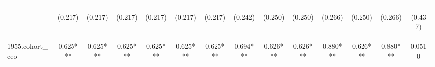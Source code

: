 \begin{center}
\begin{tabular}{lccccccccccccc}
\vspace{4pt} & \begin{footnotesize}(0.217)\end{footnotesize} & \begin{footnotesize}(0.217)\end{footnotesize} & \begin{footnotesize}(0.217)\end{footnotesize} & \begin{footnotesize}(0.217)\end{footnotesize} & \begin{footnotesize}(0.217)\end{footnotesize} & \begin{footnotesize}(0.217)\end{footnotesize} & \begin{footnotesize}(0.242)\end{footnotesize} & \begin{footnotesize}(0.250)\end{footnotesize} & \begin{footnotesize}(0.250)\end{footnotesize} & \begin{footnotesize}(0.266)\end{footnotesize} & \begin{footnotesize}(0.250)\end{footnotesize} & \begin{footnotesize}(0.266)\end{footnotesize} & \begin{footnotesize}(0.437)\end{footnotesize} \\
1955.cohort\_ceo & 0.625*** & 0.625*** & 0.625*** & 0.625*** & 0.625*** & 0.625*** & 0.694*** & 0.626*** & 0.626*** & 0.880*** & 0.626*** & 0.880*** & 0.0510 \\

\end{tabular}
\end{center}
